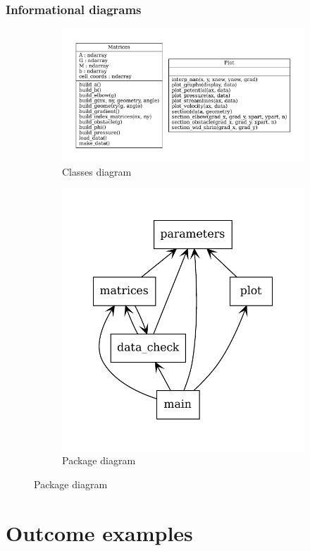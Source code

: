 \section{Informational diagrams}
\begin{figure}[htbp]
      \centering
      \begin{subfigure}{.7\textwidth}
            \centering
            \includegraphics[width=.8\linewidth]{beta/classes_all.pdf}
            \caption{Classes diagram}
      \end{subfigure}

      \begin{subfigure}{.7\textwidth}
            \centering
            \includegraphics[width=.8\linewidth]{beta/packages_all.pdf}
            \caption{Package diagram}
      \end{subfigure}
\end{figure}
\newpage
\part{Outcome examples}
